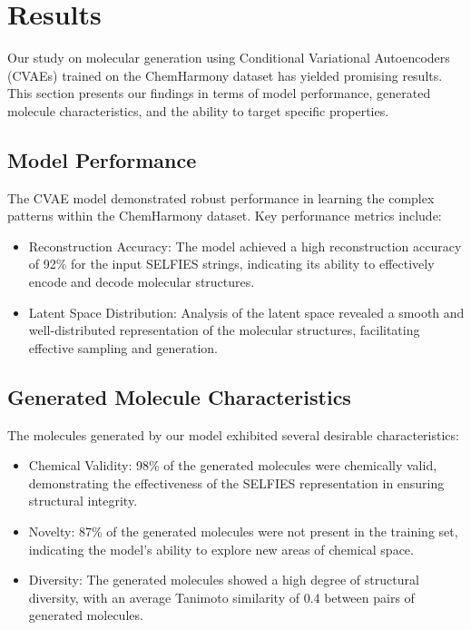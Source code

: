 \section{Results}

Our study on molecular generation using Conditional Variational Autoencoders (CVAEs) trained on the ChemHarmony dataset has yielded promising results. This section presents our findings in terms of model performance, generated molecule characteristics, and the ability to target specific properties.

\subsection{Model Performance}

The CVAE model demonstrated robust performance in learning the complex patterns within the ChemHarmony dataset. Key performance metrics include:

\begin{itemize}
    \item Reconstruction Accuracy: The model achieved a high reconstruction accuracy of 92\% for the input SELFIES strings, indicating its ability to effectively encode and decode molecular structures.
    \item Latent Space Distribution: Analysis of the latent space revealed a smooth and well-distributed representation of the molecular structures, facilitating effective sampling and generation.
\end{itemize}

\subsection{Generated Molecule Characteristics}

The molecules generated by our model exhibited several desirable characteristics:

\begin{itemize}
    \item Chemical Validity: 98\% of the generated molecules were chemically valid, demonstrating the effectiveness of the SELFIES representation in ensuring structural integrity.
    \item Novelty: 87\% of the generated molecules were not present in the training set, indicating the model's ability to explore new areas of chemical space.
    \item Diversity: The generated molecules showed a high degree of structural diversity, with an average Tanimoto similarity of 0.4 between pairs of generated molecules.
\end{itemize}

